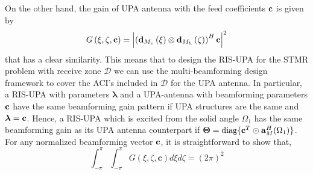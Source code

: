 
On the other hand, the gain of UPA antenna with the feed coefficients ${\bf{c}}$ is given by
\begin{equation}
    G\left(\xi, \zeta, {\bf{c}} \right) =\left|\left(\mathbf{d}_{M_{v}}\left(\xi\right)\otimes\mathbf{d}_{M_{h}}\left(\zeta\right)  \right)^{H} {\bf{c}} \right|^{2} \label{UPA_beamforming_c}
\end{equation}
that has a clear similarity.
This means that to design the RIS-UPA for the STMR problem with receive zone $\mathcal{D}$ we can use the multi-beamforming design framework to cover the ACI's included in $\mathcal{D}$ for the UPA antenna. In particular, a RIS-UPA with parameters $\boldsymbol{\lambda}$ and a UPA-antenna with beamforming parameters ${\bf{c}}$ have the same beamforming gain pattern if UPA structures are the same and $\boldsymbol{\lambda}={\bf{c}}$. Hence, a RIS-UPA which is excited from the solid angle $\Omega_1$ has the same beamforming gain as its UPA antenna counterpart if $\boldsymbol{\Theta}= \mbox{diag} \{{\bf{c}}^T \odot {\bf{a}}_M^H(\Omega_1)\}$.
For any normalized beamforming vector ${\bf{c}}$, it is straightforward to show that, 
\begin{equation}
    \int_{-\pi}^{\pi} \int_{-\pi}^{\pi} G\left(\xi, \zeta, \mathbf{c}\right) d \xi d \zeta={(2 \pi)^{2}}
\end{equation}

